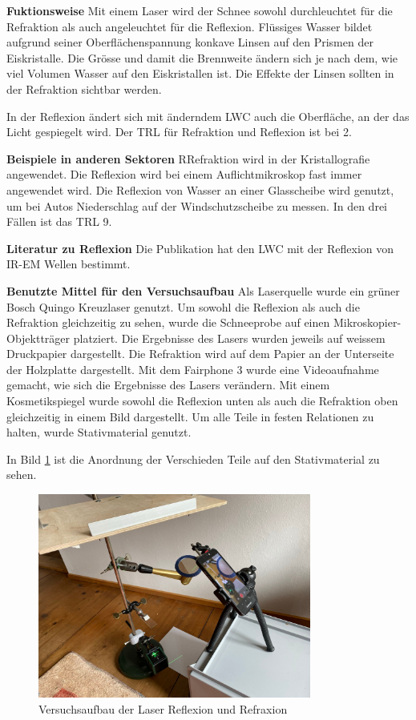 

\textbf{Fuktionsweise} Mit einem Laser wird der Schnee sowohl durchleuchtet für die Refraktion als auch angeleuchtet für die Reflexion. Flüssiges Wasser bildet aufgrund seiner Oberflächenspannung konkave Linsen auf den Prismen der Eiskristalle. Die Grösse und damit die Brennweite ändern sich je nach dem, wie viel Volumen Wasser auf den Eiskristallen ist. Die Effekte der Linsen sollten in der Refraktion sichtbar werden.

In der Reflexion ändert sich mit änderndem LWC auch die Oberfläche, an der das Licht gespiegelt wird. Der TRL für Refraktion und Reflexion ist bei 2.


\textbf{Beispiele in anderen Sektoren}
RRefraktion wird in der Kristallografie angewendet. Die Reflexion wird bei einem Auflichtmikroskop fast immer angewendet wird. Die Reflexion von Wasser an einer Glasscheibe wird genutzt, um bei Autos Niederschlag auf der Windschutzscheibe zu messen. In den drei Fällen ist das TRL 9.

\textbf{Literatur zu Reflexion}
Die Publikation \cite{} hat den LWC mit der Reflexion von IR-EM Wellen bestimmt.

\textbf{Benutzte Mittel für den Versuchsaufbau}
Als Laserquelle wurde ein grüner Bosch Quingo Kreuzlaser genutzt. Um sowohl die Reflexion als auch die Refraktion gleichzeitig zu sehen, wurde die Schneeprobe auf einen Mikroskopier-Objektträger platziert. Die Ergebnisse des Lasers wurden jeweils auf weissem Druckpapier dargestellt. Die Refraktion wird auf dem Papier an der Unterseite der Holzplatte dargestellt. Mit dem Fairphone 3 wurde eine Videoaufnahme gemacht, wie sich die Ergebnisse des Lasers verändern. Mit einem Kosmetikspiegel wurde sowohl die Reflexion unten als auch die Refraktion oben gleichzeitig in einem Bild dargestellt. Um alle Teile in festen Relationen zu halten, wurde Stativmaterial genutzt.



In Bild \ref{fig:LaserAufbau} ist die Anordnung der Verschieden Teile auf den Stativmaterial zu sehen.


\begin{figure}
    \centering
    \includegraphics[width=0.8\textwidth]{Bilder/signal-2024-03-10-112013_006.jpeg}
    \caption{Versuchsaufbau der Laser Reflexion und Refraxion}
    \label{fig:LaserAufbau}
\end{figure}


